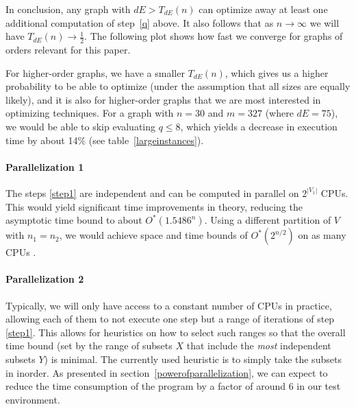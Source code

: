 \documentclass{cslthse-msc}
\newcommand{\density}{dE}
\begin{document}
In conclusion, any graph with $\density{} > T_{\density{}}(n)$ can optimize away at least one additional computation of step~\ref{q} above. It also follows that as $n \rightarrow \infty$ we will have $T_{\density{}}(n) \rightarrow \frac{1}{2}$. The following plot shows how fast we converge for graphs of orders relevant for this paper.

\begin{center}
\end{center}
For higher-order graphs, we have a smaller $T_{\density{}}(n)$, which gives us a higher probability to be able to optimize (under the assumption that all sizes are equally likely), and it is also for higher-order graphs that we are most interested in optimizing techniques. For a graph with $n=30$ and $m = 327$ (where $\density{} = 75$), we would be able to skip evaluating $q\leq8$, which yields a decrease in execution time by about 14\% (see table~\ref{largeinstances}).

\paragraph{Parallelization 1}\label{parallelization1} The steps \ref{step1} are independent and can be computed in parallel on $2^{|V_1|}$ CPUs. This would yield significant time improvements in theory, reducing the asymptotic time bound to about $O^*(1.5486^n)$. Using a different partition of $V$ with $n_1 = n_2$, we would achieve space and time bounds of $O^*(2^{n/2})$ on as many CPUs \cite{cov_pack}.

\paragraph{Parallelization 2}\label{parallelization2} Typically, we will only have access to a constant number of CPUs in practice, allowing each of them to not execute one step but a range of iterations of step \ref{step1}. This allows for heuristics on how to select such ranges so that the overall time bound (set by the range of subsets $X$ that include the \emph{most} independent subsets $Y$) is minimal. The currently used heuristic is to simply take the subsets in inorder. As presented in section~\ref{powerofparallelization}, we can expect to reduce the time consumption of the program by a factor of around 6 in our test environment.
\end{document}
